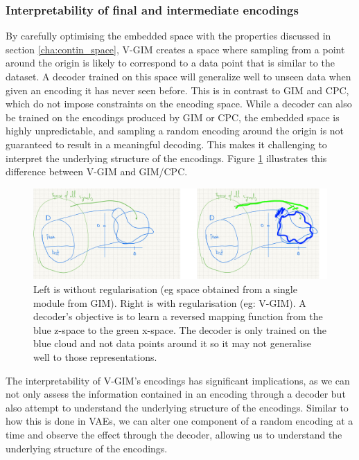 	\subsubsection{Interpretability of final and intermediate encodings}
		By carefully optimising the embedded space with the properties discussed in section \ref{cha:contin_space}, V-GIM creates a space where sampling from a point around the origin is likely to correspond to a data point that is similar to the dataset. A decoder trained on this space will generalize well to unseen data when given an encoding it has never seen before. This is in contrast to GIM and CPC, which do not impose constraints on the encoding space. While a decoder can also be trained on the encodings produced by GIM or CPC, the embedded space is highly unpredictable, and sampling a random encoding around the origin is not guaranteed to result in a meaningful decoding. This makes it challenging to interpret the underlying structure of the encodings. Figure \ref{fig:no-regularisation} illustrates this difference between V-GIM and GIM/CPC.
		
	
		\begin{figure} %
			\centering
			\includegraphics[width=0.7\linewidth]{"no regularisation"}
			\caption{Left is without regularisation (eg space obtained from a single module from GIM). Right is with regularisation (eg: V-GIM). A decoder's objective is to learn a reversed mapping function from the blue z-space to the green x-space. The decoder is only trained on the blue cloud and not data points around it so it may not generalise well to those representations. }
			\label{fig:no-regularisation}
		\end{figure}
	
		The interpretability of V-GIM's encodings has significant implications, as we can not only assess the information contained in an encoding through a decoder but also attempt to understand the underlying structure of the encodings. Similar to how this is done in VAEs, we can alter one component of a random encoding at a time and observe the effect through the decoder, allowing us to understand the underlying structure of the encodings.
		
